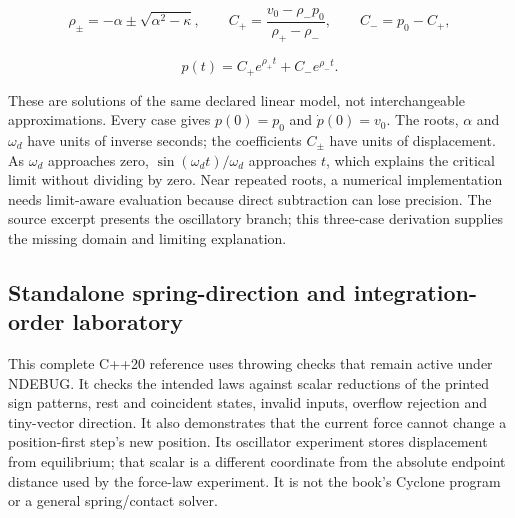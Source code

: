 \[
\rho_\pm=-\alpha\pm\sqrt{\alpha^2-\kappa},\qquad
C_+=\frac{v_0-\rho_-p_0}{\rho_+-\rho_-},\qquad C_-=p_0-C_+,
\]

\[
p(t)=C_+e^{\rho_+t}+C_-e^{\rho_-t}.
\]

These are solutions of the same declared linear model, not interchangeable approximations. Every case gives \(p(0)=p_0\) and \(\dot p(0)=v_0\). The roots, \(\alpha\) and \(\omega_d\) have units of inverse seconds; the coefficients \(C_\pm\) have units of displacement. As \(\omega_d\) approaches zero, \(\sin(\omega_d t)/\omega_d\) approaches \(t\), which explains the critical limit without dividing by zero. Near repeated roots, a numerical implementation needs limit-aware evaluation because direct subtraction can lose precision. The source excerpt presents the oscillatory branch; this three-case derivation supplies the missing domain and limiting explanation.

\subsection{Standalone spring-direction and integration-order laboratory}\label{06-engine-ii-ch047-standalone-spring-direction-and-integration-order-laboratory}

\hypertarget{06-engine-ii-ch047-standalone-spring-direction-and-integration-order-laboratory}{}

This complete C++20 reference uses throwing checks that remain active under NDEBUG. It checks the intended laws against scalar reductions of the printed sign patterns, rest and coincident states, invalid inputs, overflow rejection and tiny-vector direction. It also demonstrates that the current force cannot change a position-first step's new position. Its oscillator experiment stores displacement from equilibrium; that scalar is a different coordinate from the absolute endpoint distance used by the force-law experiment. It is not the book's Cyclone program or a general spring/contact solver.

